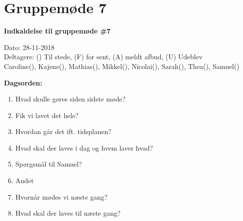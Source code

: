 \section{Gruppemøde 7}

\vspace{0.5 cm}
\textbf{Indkaldelse til gruppemøde \#7}

Dato: 28-11-2018 \\
Deltagere: () Til stede, (F) for sent, (A) meldt afbud, (U) Udeblev \\
Caroline(), Kajene(), Mathias(), Mikkel(), Nicolai(), Sarah(), Thea(), Samuel() 

\vspace{0.1 cm}
\textbf{Dagsorden:}

\begin{enumerate}
	\item Hvad skulle gøres siden sidste møde?
	\item Fik vi lavet det hele?
	\item Hvordan går det ift. tidsplanen?
	\item Hvad skal der laves i dag og hvem laver hvad?
	\item Spørgsmål til Samuel?
	\item Andet
	\item Hvornår mødes vi næste gang?
	\item Hvad skal der laves til næste gang?
\end{enumerate}

